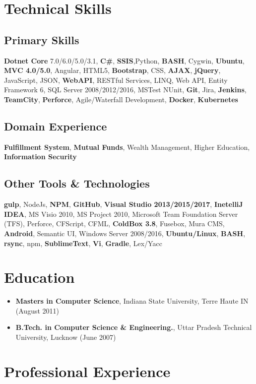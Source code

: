 \documentclass[letterpaper,10pt]{article}
\begin{document}
\section{Technical Skills}
\subsection{Primary Skills}
\textbf{Dotnet Core} 7.0/6.0/5.0/3.1, \textbf{C\#}, \textbf{SSIS},Python, \textbf{BASH}, Cygwin, \textbf{Ubuntu}, \textbf{MVC 4.0/5.0}, Angular, HTML5, \textbf{Bootstrap}, CSS, \textbf{AJAX}, \textbf{jQuery}, JavaScript, JSON, \textbf{WebAPI}, RESTful Services, LINQ, Web API, Entity Framework 6, SQL Server 2008/2012/2016, MSTest NUnit, \textbf{Git}, Jira, \textbf{Jenkins}, \textbf{TeamCity}, \textbf{Perforce}, Agile/Waterfall Development, \textbf{Docker}, \textbf{Kubernetes}

\subsection{Domain Experience}
\textbf{Fulfillment System}, \textbf{Mutual Funds}, Wealth Management, Higher Education, \textbf{Information Security}

\subsection{Other Tools \& Technologies}
\textbf{gulp}, NodeJs, \textbf{NPM}, \textbf{GitHub}, \textbf{Visual Studio 2013/2015/2017}, \textbf{InetelliJ IDEA}, MS Visio 2010, MS Project 2010, Microsoft Team Foundation Server (TFS), Perforce, CFScript, CFML, \textbf{ColdBox 3.8}, Fusebox, Mura CMS, \textbf{Android}, Semantic UI, Windows Server 2008/2016, \textbf{Ubuntu/Linux}, \textbf{BASH}, \textbf{rsync}, npm, \textbf{SublimeText}, \textbf{Vi}, \textbf{Gradle}, Lex/Yacc

\section{Education}
\begin{itemize}
    \item \textbf{Masters in Computer Science}, Indiana State University, Terre Haute IN (August 2011)
    \item \textbf{B.Tech. in Computer Science \& Engineering.}, Uttar Pradesh Technical University, Lucknow (June 2007)
\end{itemize}

\section{Professional Experience}
\end{document}
